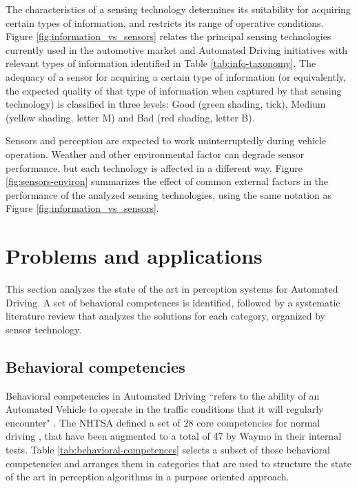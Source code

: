 \documentclass[journal]{IEEEtran}
\begin{document}
The characteristics of a sensing technology determines its 
suitability for acquiring certain types of information, and restricts its range 
of operative conditions.
Figure \ref{fig:information_vs_sensors} relates the principal sensing 
technologies currently used in the automotive market and Automated Driving
initiatives with relevant types of information identified in Table 
\ref{tab:info-taxonomy}. The adequacy of a sensor for acquiring a certain type
of information (or equivalently, the expected quality of that type of
information when captured by that sensing technology) is classified in three
levels: Good (green shading, tick), Medium (yellow shading, letter M) and Bad
(red shading, letter B).

Sensors and perception are expected to work uninterruptedly during vehicle 
operation. Weather and other environmental factor can degrade sensor
performance, but each technology is affected in a different way. 
Figure \ref{fig:sensors-environ} summarizes the effect of common external
factors in the performance of the analyzed sensing technologies, using the
same notation as Figure \ref{fig:information_vs_sensors}.

\section{Problems and applications}
\label{sec:03-problemsapplications}

This section analyzes the state of the art in perception systems for Automated
Driving. A set of behavioral competences is identified, followed
by a systematic literature review that analyzes the 
solutions for each category, organized by sensor technology.

\subsection{Behavioral competencies}

Behavioral competencies in Automated Driving ``refers to the ability of an 
Automated Vehicle to operate in the traffic conditions that it will regularly
encounter" \cite{Nowakowski2015}. The NHTSA defined a set of 28 core 
competencies for normal driving \cite{NHTSA2016}, that have been augmented to a 
total of 47 by Waymo \cite{Waymo2017} in their internal tests.
Table \ref{tab:behavioral-competences} selects a subset of those behavioral
competencies and arranges them in categories that are used to structure the state of the art in
perception algorithms in a purpose oriented approach.
\end{document}
